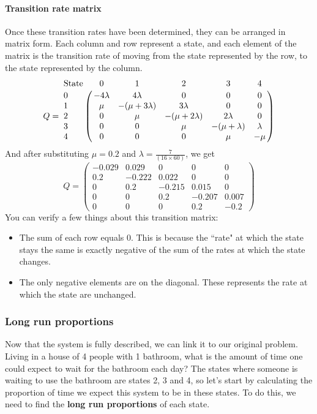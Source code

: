 \paragraph{Transition rate matrix}
Once these transition rates have been determined, they can be arranged in matrix form. Each column and row represent a state, and each element of the matrix is the transition rate of moving from the state represented by the row, to the state represented by the column.
$$
Q=
\bordermatrix{	\text{State} 	&\text{0} 	&\text{1}	& \text{2} 	& \text{3} 	& \text{4} \cr
\text{0} 	& -4\lambda &	4\lambda	&	0 			& 0 			& 0	\cr
\text{1} 	&   \mu  	&-(\mu+3\lambda)&3\lambda 		& 0 			& 0	\cr
\text{2} 	&   0  		&	\mu			&-(\mu+2\lambda)&2\lambda 		& 0	\cr
\text{3} 	&   0  		&	0			&	\mu 		&-(\mu+\lambda)	& \lambda\cr
\text{4}	&	0		&	0			&	0			& \mu 			& -\mu}
$$
And after substituting $\mu = 0.2 $ and $\lambda = \frac{7}{(16 \times 60)} $, we get
$$ Q=
\begin{pmatrix}
-0.029	&	0.029	&	0 		& 0 		& 0	\\
0.2  	&	-0.222	& 0.022 	& 0 		& 0	\\
0  		&	0.2		&-0.215		&0.015 		& 0	\\
0  		&	0		&	0.2 	&-0.207		& 0.007\\
0		&	0		&	0		& 0.2 		& -0.2
\end{pmatrix}
$$
You can verify a few things about this transition matrix:
\begin{itemize}
	\item The sum of each row equals 0. This is because the ``rate" at which the state stays the same is exactly negative of the sum of the rates at which the state changes.
	\item The only negative elements are on the diagonal. These represents the rate at which the state are unchanged.
\end{itemize}


\subsubsection*{Long run proportions}
Now that the system is fully described, we can link it to our original problem. Living in a house of 4 people with 1 bathroom, what is the amount of time one could expect to wait for the bathroom each day? The states where someone is waiting to use the bathroom are states 2, 3 and 4, so let's start by calculating the proportion of time we expect this system to be in these states. To do this, we need to find the \textbf{long run proportions} of each state.

